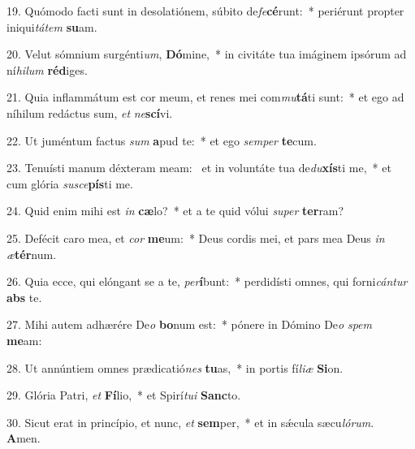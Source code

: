 19. Quómodo facti sunt in desolatiónem, súbito de\textit{fe}\textbf{cé}runt:~*  periérunt propter iniqui\textit{tá}\textit{tem} \textbf{su}am.\

20. Velut sómnium surgénti\textit{um}, \textbf{Dó}mine,~*  in civitáte tua imáginem ipsórum ad ní\textit{hi}\textit{lum} \textbf{réd}iges.\

21. Quia inflammátum est cor meum, et renes mei com\textit{mu}\textbf{tá}ti sunt:~*  et ego ad níhilum redáctus sum, \textit{et} \textit{ne}\textbf{scí}vi.\

22. Ut juméntum factus \textit{sum} \textbf{a}pud te:~*  et ego \textit{sem}\textit{per} \textbf{te}cum.\

23. Tenuísti manum déxteram meam: \dag\  et in voluntáte tua de\textit{du}\textbf{xís}ti me,~*  et cum glória \textit{su}\textit{sce}\textbf{pís}ti me.\

24. Quid enim mihi est \textit{in} \textbf{cæ}lo?~*  et a te quid vólui \textit{su}\textit{per} \textbf{ter}ram?\

25. Defécit caro mea, et \textit{cor} \textbf{me}um:~*  Deus cordis mei, et pars mea Deus \textit{in} \textit{æ}\textbf{tér}num.\

26. Quia ecce, qui elóngant se a te, \textit{per}\textbf{í}bunt:~*  perdidísti omnes, qui forni\textit{cán}\textit{tur} \textbf{abs} te.\

27. Mihi autem adhærére De\textit{o} \textbf{bo}num est:~*  pónere in Dómino De\textit{o} \textit{spem} \textbf{me}am:\

28. Ut annúntiem omnes prædicatió\textit{nes} \textbf{tu}as,~*  in portis fí\textit{li}\textit{æ} \textbf{Si}on.\

29. Glória Patri, \textit{et} \textbf{Fí}lio,~*  et Spirí\textit{tu}\textit{i} \textbf{Sanc}to.\

30. Sicut erat in princípio, et nunc, \textit{et} \textbf{sem}per,~*  et in sǽcula sæcu\textit{ló}\textit{rum}. \textbf{A}men.\

